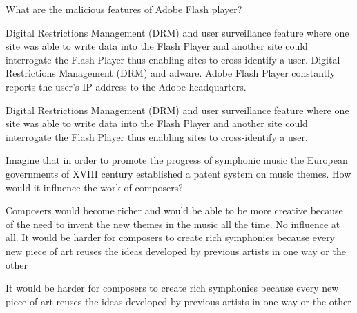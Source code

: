 \begin{question}[type=exam]
What are the malicious features of Adobe Flash player?
\begin{itemize}
\chk Digital Restrictions Management (DRM) and user surveillance feature where one site was able to write data into the Flash Player and another site could interrogate the Flash Player thus enabling sites to cross-identify a user.
\chk Digital Restrictions Management (DRM) and adware.
\chk Adobe Flash Player constantly reports the user's IP address to the Adobe headquarters.
\end{itemize}
\end{question}
\begin{solution}
Digital Restrictions Management (DRM) and user surveillance feature where one site was able to write data into the Flash Player and another site could interrogate the Flash Player thus enabling sites to cross-identify a user.
\end{solution}

\begin{question}[type=exam]
Imagine that in order to promote the progress of symphonic music the European governments of XVIII century established a patent system on music themes. How would it influence the work of composers?
\begin{itemize}
\chk Composers would become richer and would be able to be more creative because of the need to invent the new themes in the music all the time.
\chk No influence at all.
\chk It would be harder for composers to create rich symphonies because every new piece of art reuses the ideas developed by previous artists in one way or the other
\end{itemize}
\end{question}
\begin{solution}
It would be harder for composers to create rich symphonies because every new piece of art reuses the ideas developed by previous artists in one way or the other
\end{solution}


